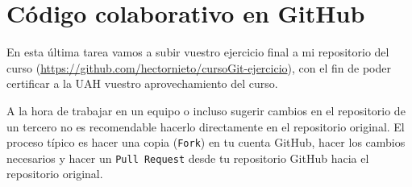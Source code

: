 \documentclass[a4paper,11pt]{report}
\begin{document}
  \chapter{Código colaborativo en GitHub}
   En esta última tarea vamos a subir vuestro ejercicio final a mi repositorio del curso (\url{https://github.com/hectornieto/cursoGit-ejercicio}), con el fin de poder certificar a la UAH vuestro aprovechamiento del curso.
   
   A la hora de trabajar en un equipo o incluso sugerir cambios en el repositorio de un tercero no es recomendable hacerlo directamente en el repositorio original. El proceso típico es hacer una copia (\verb+Fork+) en tu cuenta GitHub, hacer los cambios necesarios y hacer un \verb+Pull Request+ desde tu repositorio GitHub hacia el repositorio original.
   
\end{document}
